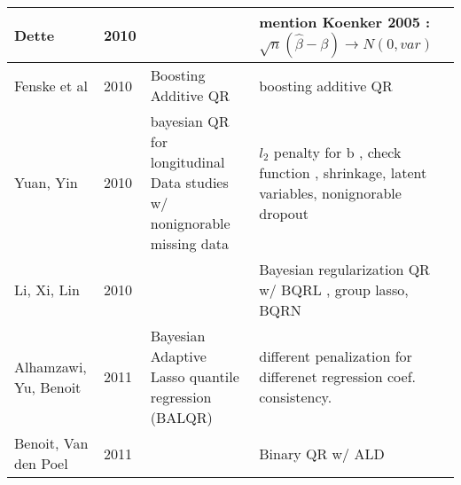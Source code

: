 \documentclass{article}
\begin{document}
\begin{table}[htbp]
\begin{tabular}[tb]{m{4cm}|m{1cm}|m{5cm}|m{5cm}}
\hline 
Dette                     & 2010 &                                              & mention Koenker 2005 : $\sqrt{n} ( \hat{\beta}-\beta)
\to N(0, var)$                                                                                                                  \\
\hline
Fenske et al              & 2010 & Boosting Additive QR                         & boosting additive QR                          \\
\hline 
Yuan, Yin                 & 2010 & bayesian QR for longitudinal Data studies w/
nonignorable missing data & $l_2$ penalty for b , check function ,
shrinkage, latent variables, nonignorable dropout                                                                               \\
\hline
Li, Xi, Lin               & 2010 &                                              & Bayesian regularization QR w/ BQRL , group
lasso, BQRN                                                                                                                     \\
\hline
Alhamzawi, Yu, Benoit     & 2011 & Bayesian Adaptive Lasso quantile
regression (BALQR)        & different penalization for differenet regression
coef. consistency.
                                                                                                                                \\
\hline
Benoit, Van den Poel      & 2011 &                                              & Binary QR w/ ALD                                     \\
\hline 

\end{tabular}
\end{table}
\end{document}
